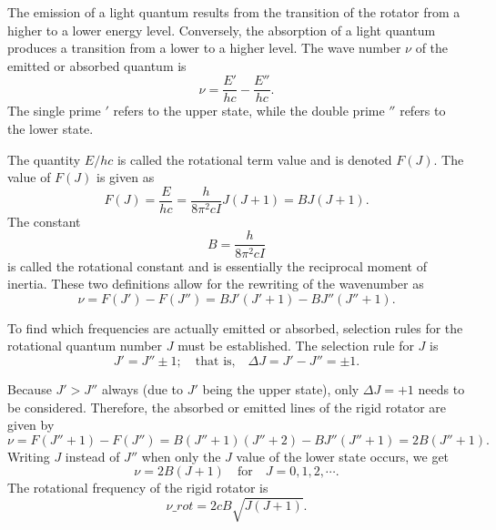 \documentclass[11pt, twoside, fleqn]{report}
\begin{document}
The emission of a light quantum results from the transition of the rotator from a higher to a lower energy level. Conversely, the absorption of a light quantum produces a transition from a lower to a higher level. The wave number $\nu$ of the emitted or absorbed quantum is
\begin{equation*}
    \nu = \frac{E'}{hc} - \frac{E''}{hc}.
\end{equation*}
The single prime $'$ refers to the upper state, while the double prime $''$ refers to the lower state.

The quantity $E/hc$ is called the rotational term value and is denoted $F(J)$. The value of $F(J)$ is given as
\begin{equation*}
    F(J) = \frac{E}{hc} = \frac{h}{8\pi^2cI}J(J + 1) = BJ(J + 1).
\end{equation*}
The constant
\begin{equation*}
    B = \frac{h}{8\pi^2cI}
\end{equation*}
is called the rotational constant and is essentially the reciprocal moment of inertia. These two definitions allow for the rewriting of the wavenumber as
\begin{equation*}
    \nu = F(J')- F(J'') = BJ'(J' + 1) - BJ''(J'' + 1).
\end{equation*}

To find which frequencies are actually emitted or absorbed, selection rules for the rotational quantum number $J$ must be established. The selection rule for $J$ is
\begin{equation*}
    J' = J'' \pm 1; \quad\text{that is,}\quad \Delta{}J = J' - J'' = \pm 1.
\end{equation*}

Because $J' > J''$ always (due to $J'$ being the upper state), only $\Delta{}J = +1$ needs to be considered. Therefore, the absorbed or emitted lines of the rigid rotator are given by
\begin{equation*}
    \nu = F(J'' + 1) - F(J'') = B(J'' + 1)(J'' + 2) - BJ''(J'' + 1) = 2B(J'' + 1).
\end{equation*}
Writing $J$ instead of $J''$ when only the $J$ value of the lower state occurs, we get
\begin{equation*}
    \nu = 2B(J + 1) \quad\text{for}\quad J = 0, 1, 2, \dotsb.
\end{equation*}
The rotational frequency of the rigid rotator is
\begin{equation*}
    \nu\_{rot} = 2cB\sqrt{J(J + 1)}.
\end{equation*}
\end{document}
